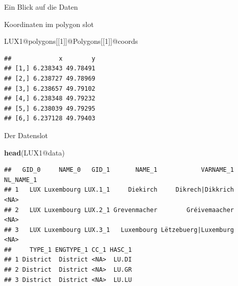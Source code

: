 \documentclass[ignorenonframetext,]{beamer}
\newenvironment{Shaded}{\begin{snugshade}}{\end{snugshade}}
\newcommand{\KeywordTok}[1]{\textcolor[rgb]{0.26,0.66,0.93}{\textbf{#1}}}
\newcommand{\DecValTok}[1]{\textcolor[rgb]{0.27,0.67,0.26}{#1}}
\newcommand{\OperatorTok}[1]{\textcolor[rgb]{0.74,0.68,0.62}{#1}}
\newcommand{\NormalTok}[1]{\textcolor[rgb]{0.74,0.68,0.62}{#1}}
\begin{document}
\begin{frame}[fragile]{Ein Blick auf die Daten}

Koordinaten im polygon slot

\begin{Shaded}
\begin{Highlighting}[]
\NormalTok{LUX1}\OperatorTok{@}\NormalTok{polygons[[}\DecValTok{1}\NormalTok{]]}\OperatorTok{@}\NormalTok{Polygons[[}\DecValTok{1}\NormalTok{]]}\OperatorTok{@}\NormalTok{coords}
\end{Highlighting}
\end{Shaded}

\begin{verbatim}
##             x        y
## [1,] 6.238343 49.78491
## [2,] 6.238727 49.78969
## [3,] 6.238657 49.79102
## [4,] 6.238348 49.79232
## [5,] 6.238039 49.79295
## [6,] 6.237128 49.79403
\end{verbatim}

\end{frame}

\begin{frame}[fragile]{Der Datenslot}

\begin{Shaded}
\begin{Highlighting}[]
\KeywordTok{head}\NormalTok{(LUX1}\OperatorTok{@}\NormalTok{data)}
\end{Highlighting}
\end{Shaded}

\begin{verbatim}
##   GID_0     NAME_0   GID_1       NAME_1            VARNAME_1 NL_NAME_1
## 1   LUX Luxembourg LUX.1_1     Diekirch     Dikrech|Dikkrich      <NA>
## 2   LUX Luxembourg LUX.2_1 Grevenmacher        Gréivemaacher      <NA>
## 3   LUX Luxembourg LUX.3_1   Luxembourg Lëtzebuerg|Luxemburg      <NA>
##     TYPE_1 ENGTYPE_1 CC_1 HASC_1
## 1 District  District <NA>  LU.DI
## 2 District  District <NA>  LU.GR
## 3 District  District <NA>  LU.LU
\end{verbatim}

\end{frame}
\end{document}
